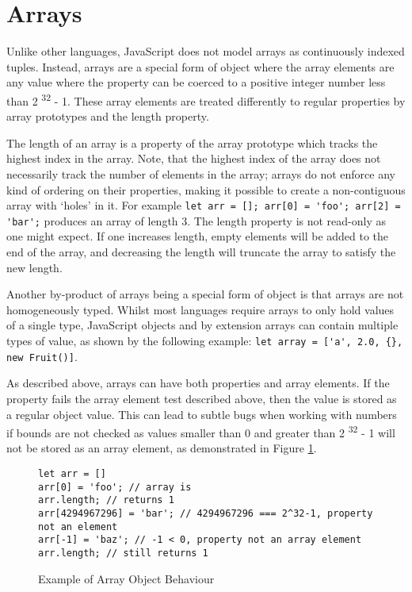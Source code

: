 \documentclass[]{final_report}
\begin{document}
\section{Arrays} \label{sec:arrays}
Unlike other languages, JavaScript does not model arrays as continuously indexed tuples. Instead, arrays are a special form of object where the array elements are any value where the property can be coerced to a positive integer number less than 2 \textsuperscript{32} - 1. These array elements are treated differently to regular properties by array prototypes and the length property. 

The length of an array is a property of the array prototype which tracks the highest index in the array. Note, that the highest index of the array does not necessarily track the number of elements in the array; arrays do not enforce any kind of ordering on their properties, making it possible to create a non-contiguous array with `holes' in it. For example \lstinline|let arr = []; arr[0] = 'foo'; arr[2] = 'bar';| produces an array of length 3. The length property is not read-only as one might expect. If one increases length, empty elements will be added to the end of the array, and decreasing the length will truncate the array to satisfy the new length.

Another by-product of arrays being a special form of object is that arrays are not homogeneously typed. Whilst most languages require arrays to only hold values of a single type, JavaScript objects and by extension arrays can contain multiple types of value, as shown by the following example: \lstinline|let array = ['a', 2.0, {}, new Fruit()]|. 

As described above, arrays can have both properties and array elements. If the property fails the array element test described above, then the value is stored as a regular object value. This can lead to subtle bugs when working with numbers if bounds are not checked as values smaller than 0 and greater than 2  \textsuperscript{32} - 1 will not be stored as an array element, as demonstrated in Figure \ref{fig:js-array-max-length}.

\begin{figure}[t]
\begin{lstlisting}
let arr = []
arr[0] = 'foo'; // array is 
arr.length; // returns 1
arr[4294967296] = 'bar'; // 4294967296 === 2^32-1, property not an element
arr[-1] = 'baz'; // -1 < 0, property not an array element
arr.length; // still returns 1
\end{lstlisting}
\caption{\label{fig:js-array-max-length} Example of Array Object Behaviour}
\end{figure}
\end{document}
